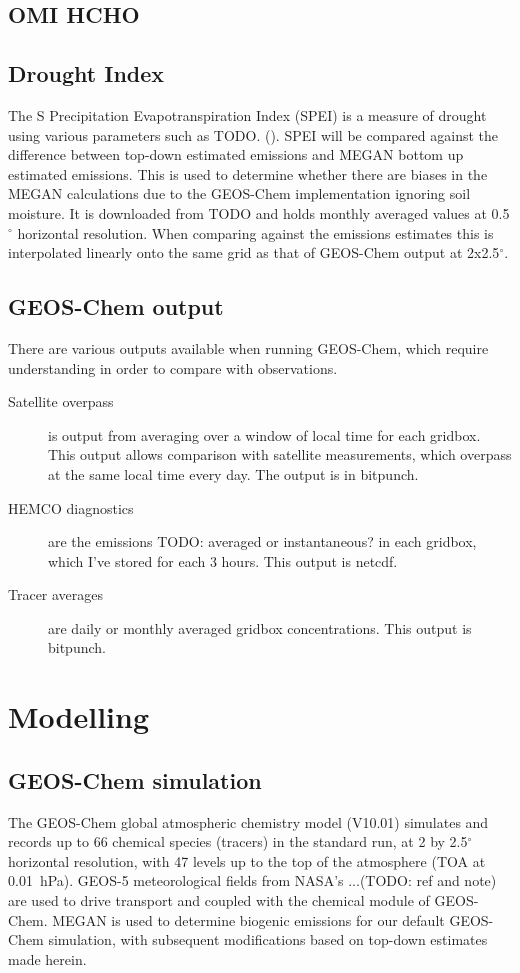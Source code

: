   \subsection{OMI HCHO}
  
  \subsection{Drought Index}
    The S Precipitation Evapotranspiration Index (SPEI) is a measure of drought using various parameters such as TODO. (\cite{Wang2017}).
    SPEI will be compared against the difference between top-down estimated emissions and MEGAN bottom up estimated emissions. 
    This is used to determine whether there are biases in the MEGAN calculations due to the GEOS-Chem implementation ignoring soil moisture.
    It is downloaded from TODO and holds monthly averaged values at 0.5$^{\circ}$ horizontal resolution.
    When comparing against the emissions estimates this is interpolated linearly onto the same grid as that of GEOS-Chem output at 2x2.5$^{\circ}$.
  
  \subsection{GEOS-Chem output}
    There are various outputs available when running GEOS-Chem, which require understanding in order to compare with observations.
    \begin{description}
      \item[Satellite overpass] is output from averaging over a window of local time for each gridbox. 
        This output allows comparison with satellite measurements, which overpass at the same local time every day.
        The output is in bitpunch.
      \item[HEMCO diagnostics] are the emissions TODO: averaged or instantaneous? in each gridbox, which I've stored for each 3 hours.
        This output is netcdf.
      \item[Tracer averages] are daily or monthly averaged gridbox concentrations.
        This output is bitpunch.
        
    \end{description}
  
\section{Modelling}
  \label{BioIsop:Model}
  
  \subsection{GEOS-Chem simulation}
    \label{BioIsop:Model:GC}
    The GEOS-Chem global atmospheric chemistry model (V10.01) simulates and records up to 66 chemical species (tracers) in the standard run, at 2 by 2.5$^{\circ}$ horizontal resolution, with 47 levels up to the top of the atmosphere (TOA at 0.01~hPa). 
    GEOS-5 meteorological fields from NASA's ...(TODO: ref and note) are used to drive transport and coupled with the chemical module of GEOS-Chem.
    MEGAN is used to determine biogenic emissions for our default GEOS-Chem simulation, with subsequent modifications based on top-down estimates made herein.
    
